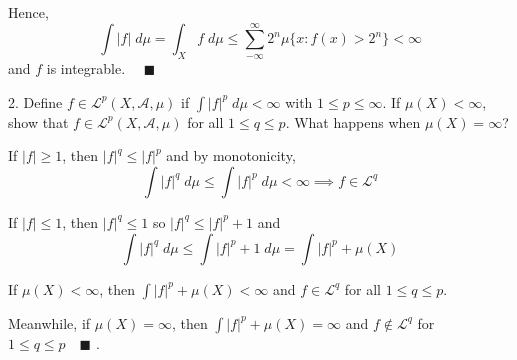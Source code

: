 \documentclass[12pt]{article}
\newcommand{\qed}{\quad \blacksquare}
\newcommand{\abs}[1]{\left\vert #1 \right\vert}
\newcommand{\A}{\mathcal{A}}
\renewcommand{\L}{\mathcal{L}}
\begin{document}
        Hence, 
        \[\int \abs{f} \; d\mu = \int_X f \; d\mu \leq \sum_{-\infty}^{\infty} 2^n\mu\{x: f(x) > 2^n\} < \infty\]
        and $f$ is integrable. $\qed$
    \color{black}

\pagebreak 

2. Define $f \in \L^p(X, \A, \mu)$ if $\int \abs{f}^p \; d\mu < \infty$ with $1 \leq p \leq \infty$. If $\mu(X) < \infty$, show that $f \in \L^p(X, \A, \mu)$ for all $1 \leq q \leq p$. What happens when $\mu(X) = \infty$?

    \color{blue}
        If $\abs{f} \geq 1$, then $\abs{f}^q \leq \abs{f}^p$ and by monotonicity, 
        \[\int \abs{f}^q\; d\mu \leq \int\abs{f}^p \; d\mu < \infty \implies f \in \L^q\]

        If $\abs{f} \leq 1$, then $\abs{f}^q \leq 1$ so $\abs{f}^q \leq \abs{f}^p + 1$ and 
        \[\int \abs{f}^q \; d\mu\leq \int \abs{f}^p + 1 \; d\mu = \int \abs{f}^p + \mu(X)\]

        If $\mu(X) < \infty$, then $\int \abs{f}^p + \mu(X) < \infty$ and $f \in \L^q$ for all $1 \leq q \leq p$. 
        
        Meanwhile, if $\mu(X) = \infty$, then $\int \abs{f}^p + \mu(X) = \infty$ and $f \notin \L^q$ for $1 \leq q \leq p \qed$ .
    \color{black}


\pagebreak 
\end{document}
